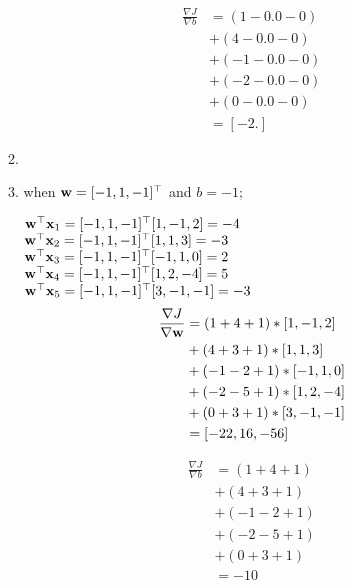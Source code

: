 \documentclass[12pt, fullpage,letterpaper]{article}
\begin{document}
\begin{enumerate}
\begin{enumerate}
\begin{align*}
    \frac{\nabla J}{\nabla b} &=
    (1 - 0.0 - 0)\\
    &+ (4 - 0.0 - 0)\\
    &+ (-1 - 0.0 - 0)\\
    &+ (-2 - 0.0 - 0)\\
    &+ (0 - 0.0 - 0)\\
    &= [-2.]
\end{align*}\item

%
%
%
%
%
%



\item when ${\bf w} = [-1,1,-1]^\top$ and $b = -1$;

${\bf w}^\top {\bf x}_1 = [-1, 1, -1]^\top[1, -1, 2]  = -4$\\
${\bf w}^\top {\bf x}_2 = [-1, 1, -1]^\top[1, 1, 3]   = -3$\\
${\bf w}^\top {\bf x}_3 = [-1, 1, -1]^\top[-1, 1, 0]  = 2 $\\
${\bf w}^\top {\bf x}_4 = [-1, 1, -1]^\top[1, 2, -4]  = 5 $\\
${\bf w}^\top {\bf x}_5 = [-1, 1, -1]^\top[3, -1, -1] = -3$ \\

\begin{align*}
    \frac{\nabla J}{\nabla {\bf w}} &=
    (1 + 4 + 1) * [1,-1,2]\\
    &+ (4 + 3 + 1) * [1,1,3]\\
    &+ (-1 - 2 + 1) * [-1,1,0]\\
    &+ (-2 - 5 + 1) * [1,2,-4]\\
    &+ (0 + 3 + 1) * [3,-1,-1]\\
    &= [-22,  16, -56]
\end{align*}

\begin{align*}
    \frac{\nabla J}{\nabla b} &=
    (1 + 4 + 1)\\
    &+ (4 + 3 + 1)\\
    &+ (-1 - 2 + 1)\\
    &+ (-2 - 5 + 1)\\
    &+ (0 + 3 + 1)\\
    &= -10
\end{align*}


\end{enumerate}
\end{enumerate}
\end{document}
